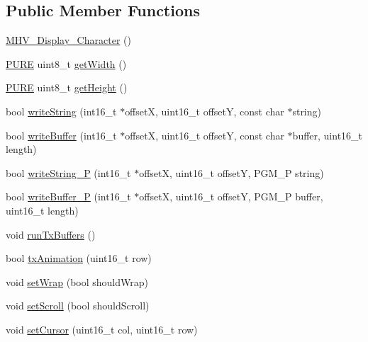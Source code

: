 \subsection*{Public Member Functions}
\begin{DoxyCompactItemize}
\item 
\hyperlink{class_m_h_v___display___character_a3b54ec2d04072912c02f968cfb163d6e}{M\-H\-V\-\_\-\-Display\-\_\-\-Character} ()
\item 
\hyperlink{_m_h_v__io_8h_acd42770aecb025cfac170d4d3ace4544}{P\-U\-R\-E} uint8\-\_\-t \hyperlink{class_m_h_v___display___character_a2aeb6d9caa1caede2e85f2b87d3c6c44}{get\-Width} ()
\item 
\hyperlink{_m_h_v__io_8h_acd42770aecb025cfac170d4d3ace4544}{P\-U\-R\-E} uint8\-\_\-t \hyperlink{class_m_h_v___display___character_a81c36de87bcf92c30fb12306dcdfffb8}{get\-Height} ()
\item 
bool \hyperlink{class_m_h_v___display___character_afa23d628448d8bb3bd981a2f7f6698db}{write\-String} (int16\-\_\-t $\ast$offset\-X, uint16\-\_\-t offset\-Y, const char $\ast$string)
\item 
bool \hyperlink{class_m_h_v___display___character_aec98a1a021fee52f6288a3f37f870b37}{write\-Buffer} (int16\-\_\-t $\ast$offset\-X, uint16\-\_\-t offset\-Y, const char $\ast$buffer, uint16\-\_\-t length)
\item 
bool \hyperlink{class_m_h_v___display___character_a47e0f4a3b8ed1c5a426848d7397aa9e2}{write\-String\-\_\-\-P} (int16\-\_\-t $\ast$offset\-X, uint16\-\_\-t offset\-Y, P\-G\-M\-\_\-\-P string)
\item 
bool \hyperlink{class_m_h_v___display___character_a8480952d34dfb22ac420cfe78002a5b0}{write\-Buffer\-\_\-\-P} (int16\-\_\-t $\ast$offset\-X, uint16\-\_\-t offset\-Y, P\-G\-M\-\_\-\-P buffer, uint16\-\_\-t length)
\item 
void \hyperlink{class_m_h_v___display___character_a84177df023d99e68bb5fd1a7ceccd017}{run\-Tx\-Buffers} ()
\item 
bool \hyperlink{class_m_h_v___display___character_a331f52e5ccc78879370b9351d2e38591}{tx\-Animation} (uint16\-\_\-t row)
\item 
void \hyperlink{class_m_h_v___display___character_a0944a0a6438f60f3f43a4163fbe5fe06}{set\-Wrap} (bool should\-Wrap)
\item 
void \hyperlink{class_m_h_v___display___character_a032eae10273e93bba65e5a5f7f07d784}{set\-Scroll} (bool should\-Scroll)
\item 
void \hyperlink{class_m_h_v___display___character_aa1bd4967cf31b0c0465d777c5115037d}{set\-Cursor} (uint16\-\_\-t col, uint16\-\_\-t row)

\end{DoxyCompactItemize}
